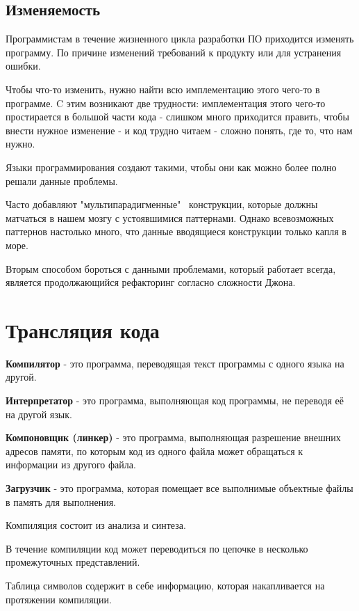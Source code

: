 \documentclass[oneside]{book}
\begin{document}
    \section{Изменяемость}
    Программистам в течение жизненного цикла
    разработки ПО приходится изменять программу.
    По причине изменений требований к продукту
    или для устранения ошибки.

    Чтобы что-то изменить,
    нужно найти всю имплементацию этого чего-то
    в программе. C этим возникают две
    трудности: имплементация этого чего-то
    простирается в большой части кода -
    слишком много приходится править, чтобы
    внести нужное изменение -
    и код трудно читаем - сложно понять,
    где то, что нам нужно.

    Языки программирования создают такими,
    чтобы они как можно более полно
    решали данные проблемы.

    Часто добавляют "мультипарадигменные" \
    конструкции, которые должны матчаться в нашем мозгу
    с устоявшимися паттернами. Однако всевозможных
    паттернов настолько много, что данные вводящиеся
    конструкции только капля в море.

    Вторым способом бороться с данными проблемами,
    который работает всегда, является продолжающийся
    рефакторинг согласно сложности Джона.

    \chapter{Трансляция кода}
    \textbf{Компилятор} - это программа,
    переводящая текст программы
    с одного языка на другой.

    \textbf{Интерпретатор} - это программа,
    выполняющая код программы,
    не переводя её на другой язык.

    \textbf{Компоновщик (линкер)} - это программа,
    выполняющая разрешение внешних
    адресов памяти, по которым код из одного
    файла может обращаться к информации из другого файла.

    \textbf{Загрузчик} - это программа,
    которая помещает все выполнимые
    объектные файлы в память для
    выполнения.

    Компиляция состоит из анализа и синтеза.

    В течение компиляции код может
    переводиться по цепочке в несколько
    промежуточных представлений.

    Таблица символов содержит в себе информацию,
    которая накапливается на протяжении компиляции.
\end{document}

